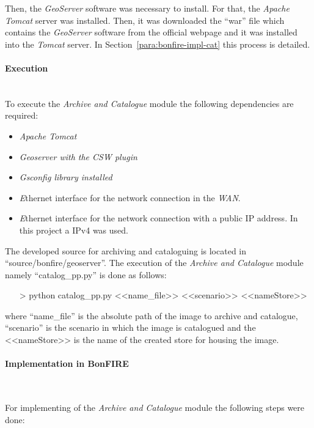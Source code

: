 Then, the \emph{GeoServer} software was necessary to install. For that, the
\emph{Apache Tomcat} server was installed. Then, it was downloaded the ``war''
file which contains the \emph{GeoServer} software from the official webpage and
it was installed into the \emph{Tomcat} server. In Section~\ref{para:bonfire-impl-cat} this process
is detailed. 

\paragraph{Execution}~\\

To execute the \emph{Archive and Catalogue} module the following dependencies
are required:
\begin{itemize}
\item \emph{Apache Tomcat}
\item \emph{Geoserver with the \ac{CSW} plugin}
\item \emph{Gsconfig library installed}
\item \emph Ethernet interface for the network connection in the \bonfire
  \emph{WAN}.
\item \emph Ethernet interface for the network connection with a public \ac{IP}
  address. In this project a \ac{IP}v4 was used.
\end{itemize}

The developed source for archiving and cataloguing is located in
``source/bonfire/geoserver''. The execution of the \emph{Archive and Catalogue}
module namely ``catalog\_pp.py'' is done as follows:
\begin{itemize}
\item[>] python catalog\_pp.py <<name\_file>> <<scenario>> <<nameStore>>
\end{itemize}
where ``name\_file'' is the absolute path of the image to archive and catalogue,
``scenario'' is the scenario in which the image is catalogued and the
<<nameStore>> is the name of the created store for housing the image.

\paragraph{Implementation in BonFIRE}~\\
\label{para:bonfire-impl-cat}


For implementing of the \emph{Archive and Catalogue} module the following steps were done:

